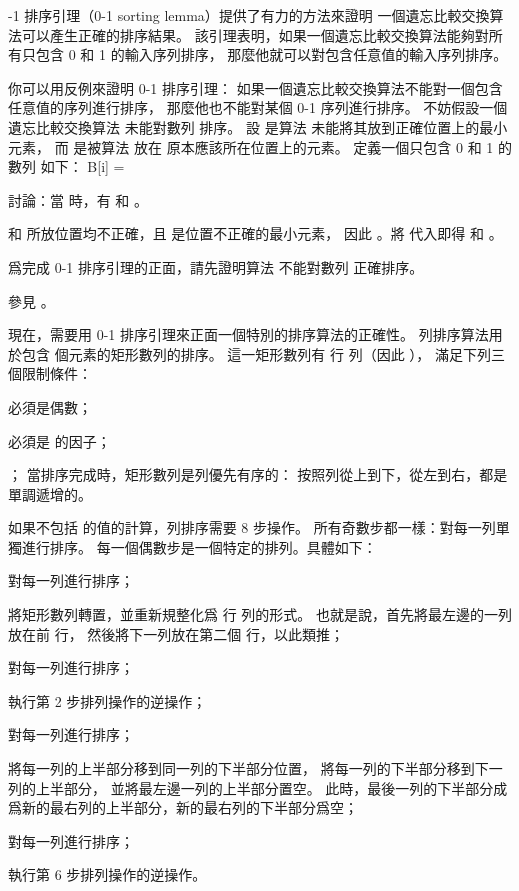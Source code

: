 {-1 排序引理（0-1 sorting lemma）}提供了有力的方法來證明
一個遺忘比較交換算法可以產生正確的排序結果。
該引理表明，如果一個遺忘比較交換算法能夠對所有只包含 0 和 1 的輸入序列排序，
那麼他就可以對包含任意值的輸入序列排序。

你可以用反例來證明 0-1 排序引理：
如果一個遺忘比較交換算法不能對一個包含任意值的序列進行排序，
那麼他也不能對某個 0-1 序列進行排序。
不妨假設一個遺忘比較交換算法  未能對數列  排序。
設  是算法  未能將其放到正確位置上的最小元素，
而  是被算法  放在  原本應該所在位置上的元素。
定義一個只包含 0 和 1 的數列  如下：
\startformula
B[i] = \startmathcases
{}	\MC {} \NR
{}	\MC {} \NR
\stopmathcases
\stopformula

\startigBase[a]
\startitem
討論：當  時，有  和 。
\stopitem

\startANSWER
{} 和  所放位置均不正確，且  是位置不正確的最小元素，
因此 。將  代入即得  和 。
\stopANSWER

\startitem
爲完成 0-1 排序引理的正面，請先證明算法  不能對數列  正確排序。
\stopitem

\startANSWER
參見 。
\stopANSWER
\stopigBase

現在，需要用 0-1 排序引理來正面一個特別的排序算法的正確性。
{\EMP 列排序}算法用於包含  個元素的矩形數列的排序。
這一矩形數列有  行  列（因此 ），
滿足下列三個限制條件：
\startigBase[2][indentnext=no]
\item {} 必須是偶數；
\item {} 必須是  的因子；
\item {}；
\stopigBase
當排序完成時，矩形數列是{\EMP 列優先有序}的：
按照列從上到下，從左到右，都是單調遞增的。

如果不包括  的值的計算，列排序需要 8 步操作。
所有奇數步都一樣：對每一列單獨進行排序。
每一個偶數步是一個特定的排列。具體如下：
\startigNum[n]
\item 對每一列進行排序；
\item 將矩形數列轉置，並重新規整化爲  行  列的形式。
也就是說，首先將最左邊的一列放在前  行，
然後將下一列放在第二個  行，以此類推；
\item 對每一列進行排序；
\item 執行第 2 步排列操作的逆操作；
\item 對每一列進行排序；
\item 將每一列的上半部分移到同一列的下半部分位置，
將每一列的下半部分移到下一列的上半部分，
並將最左邊一列的上半部分置空。
此時，最後一列的下半部分成爲新的最右列的上半部分，新的最右列的下半部分爲空；
\item 對每一列進行排序；
\item 執行第 6 步排列操作的逆操作。
\stopigNum

